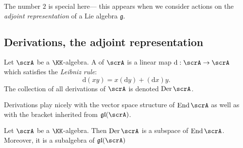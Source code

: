 \documentclass{article}
\DeclareMathOperator{\End}{End}
\DeclareMathOperator{\Der}{Der}
\newcommand{\dd}{\ensuremath{\text{d}}}
\newcommand{\frkg}{{\ensuremath{\mathfrak{g}}}}
\newcommand{\glalg}{\ensuremath{\mathfrak{gl}}}
\begin{document}
The number $2$ is special here--- this appears when we consider actions on the \textit{adjoint representation} of a Lie algebra $\frkg$.

\subsection{Derivations, the adjoint representation}

\begin{definition}
    Let $\scrA$ be a $\KK$-algebra.
    A  of $\scrA$ is a linear map $\dd: \scrA \to \scrA$ which satisfies the \textit{Leibniz rule}:
    \[
        \dd(xy)
        =
        x(\dd y) + (\dd x) y.
    \]
    The collection of all derivations of $\scrA$ is denoted $\Der \scrA$.
\end{definition}

Derivations play nicely with the vector space structure of $\End \scrA$ as well as with the bracket inherited from $\glalg(\scrA)$.

\begin{proposition}
    Let $\scrA$ be a $\KK$-algebra.
    Then $\Der \scrA$ is a subspace of $\End \scrA$.
    Moreover, it is a subalgebra of $\glalg(\scrA)$
\end{proposition}
\end{document}
